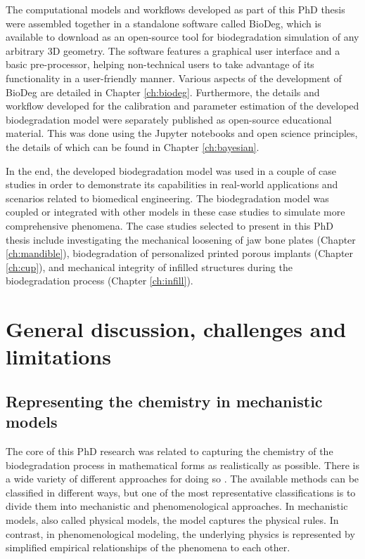 The computational models and workflows developed as part of this PhD thesis were assembled together in a standalone software called BioDeg, which is available to download as an open-source tool for biodegradation simulation of any arbitrary 3D geometry. The software features a graphical user interface and a basic pre-processor, helping non-technical users to take advantage of its functionality in a user-friendly manner. Various aspects of the development of BioDeg are detailed in Chapter \ref{ch:biodeg}. Furthermore, the details and workflow developed for the calibration and parameter estimation of the developed biodegradation model were separately published as open-source educational material. This was done using the Jupyter notebooks and open science principles, the details of which can be found in Chapter \ref{ch:bayesian}.

In the end, the developed biodegradation model was used in a couple of case studies in order to demonstrate its capabilities in real-world applications and scenarios related to biomedical engineering. The biodegradation model was coupled or integrated with other models in these case studies to simulate more comprehensive phenomena. The case studies selected to present in this PhD thesis include investigating the mechanical loosening of jaw bone plates (Chapter \ref{ch:mandible}), biodegradation of personalized printed porous implants (Chapter \ref{ch:cup}), and mechanical integrity of infilled structures during the biodegradation process (Chapter \ref{ch:infill}).



\section{General discussion, challenges and limitations}

\subsection{Representing the chemistry in mechanistic models} \label{sec:conclusion_mechanistic}


The core of this PhD research was related to capturing the chemistry of the biodegradation process in mathematical forms as realistically as possible. There is a wide variety of different approaches for doing so \cite{Abdalla2020}. The available methods can be classified in different ways, but one of the most representative classifications is to divide them into mechanistic and phenomenological approaches. In mechanistic models, also called physical models, the model captures the physical rules. In contrast, in phenomenological modeling, the underlying physics is represented by simplified empirical relationships of the phenomena to each other.

